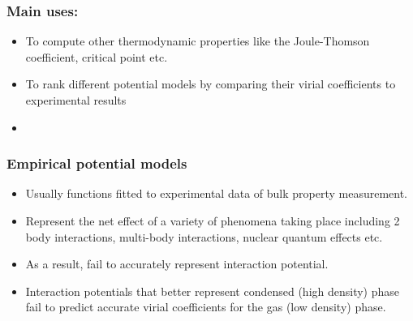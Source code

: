 \documentclass[xcolor=svgnames]{beamer}
\begin{document}
		\begin{frame}
            \frametitle{Main uses:}
			\begin{itemize}
				\justifying
				\item To compute other thermodynamic properties like the Joule-Thomson coefficient, critical point etc.
                \item To rank different potential models by comparing their virial coefficients to experimental results
				\begin{figure}
				\centering
				\end{figure}
            \item {}
			\end{itemize}
		\end{frame}
		
		\begin{frame}
			\frametitle{Empirical potential models}
			\begin{itemize}
				\justifying
				\item Usually functions fitted to experimental data of bulk property measurement.
				\item Represent the net effect of a variety of phenomena taking place including 2 body interactions, multi-body interactions, nuclear quantum effects etc.
				\item As a result, fail to accurately represent interaction potential.
				\item Interaction potentials that better represent condensed (high density) phase fail to predict accurate virial coefficients for the gas (low density) phase.
			\end{itemize}
		\end{frame}
		
\end{document}
